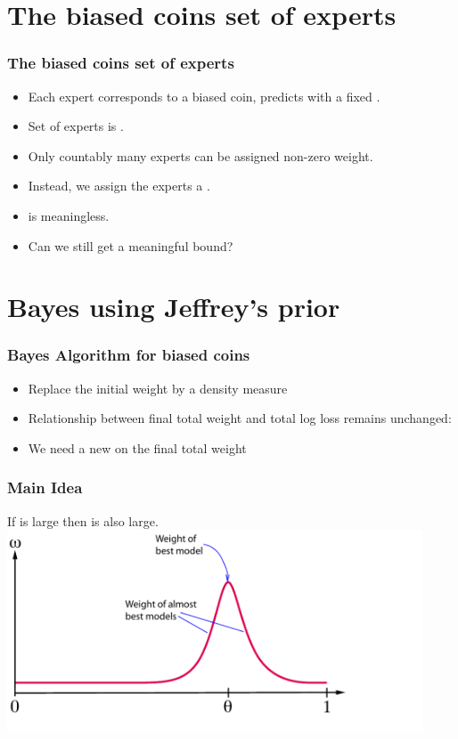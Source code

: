 \documentclass{beamer}
\begin{document}
\section{The biased coins set of experts}
\begin{frame}
\frametitle{The biased coins set of experts}
\begin{itemize}
\item Each expert corresponds to a biased coin, predicts with a fixed \R{$\theta \in [0,1]$}.
\item Set of experts is .
\item Only countably many experts can be assigned non-zero weight.
\item Instead, we assign the experts a .
\item {} is meaningless.
\item Can we still get a meaningful bound?
\end{itemize}
\end{frame}

\section{Bayes using Jeffrey's prior}

\begin{frame}
\frametitle{Bayes Algorithm for biased coins}
\begin{itemize}
\item 
Replace the initial weight by a density measure 
\item 
Relationship between final total weight and total log loss remains unchanged:
\R{\[
 \TAloss = \ln \int_0^1 \dweight{\theta}{} e^{-\TEloss{\theta}^{T+1}} d\theta
\]}
\item
We need a new  on the final total weight
\end{itemize}
\end{frame}

 \begin{frame}
\frametitle{Main Idea}
If  is large then  is also large.
~\pause
\includegraphics[height=6cm]{figures/neighborhood.pdf}
\end{frame}
\end{document}
